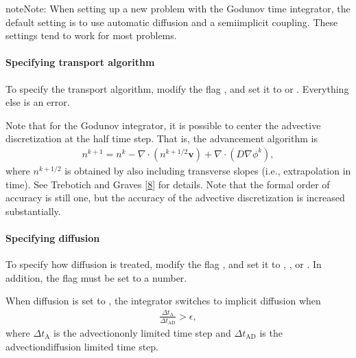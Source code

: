 \documentclass[letterpaper,10pt,english]{sphinxmanual}
\begin{document}
\begin{sphinxadmonition}{note}{Note:}
\sphinxAtStartPar
When setting up a new problem with the Godunov time integrator, the default setting is to use automatic diffusion and a semi\sphinxhyphen{}implicit coupling.
These settings tend to work for most problems.
\end{sphinxadmonition}


\paragraph{Specifying transport algorithm}
\label{\detokenize{Applications/CdrPlasmaModel:specifying-transport-algorithm}}
\sphinxAtStartPar
To specify the transport algorithm, modify the flag , and set it to  or .
Everything else is an error.

\sphinxAtStartPar
Note that for the Godunov integrator, it is possible to center the advective discretization at the half time step.
That is, the advancement algorithm is
\begin{equation*}
\begin{split}n^{k+1} = n^{k} - \nabla\cdot\left(n^{k+1/2}\mathbf{v}\right) + \nabla\cdot\left(D\nabla\phi^k\right),\end{split}
\end{equation*}
\sphinxAtStartPar
where \(n^{k+1/2}\) is obtained by also including transverse slopes (i.e., extrapolation in time).
See Trebotich and Graves {[}\hyperlink{cite.ZZReferences:id157}{8}{]} for details.
Note that the formal order of accuracy is still one, but the accuracy of the advective discretization is increased substantially.


\paragraph{Specifying diffusion}
\label{\detokenize{Applications/CdrPlasmaModel:specifying-diffusion}}
\sphinxAtStartPar
To specify how diffusion is treated, modify the flag , and set it to , , or .
In addition, the flag  must be set to a number.

\sphinxAtStartPar
When diffusion is set to , the integrator switches to implicit diffusion when
\begin{equation*}
\begin{split}\frac{\Delta t_{\textrm{A}}}{\Delta t_{\textrm{AD}}} > \epsilon,\end{split}
\end{equation*}
\sphinxAtStartPar
where \(\Delta t_{\textrm{A}}\) is the advection\sphinxhyphen{}only limited time step and \(\Delta t_{\textrm{AD}}\) is the advection\sphinxhyphen{}diffusion limited time step.
\end{document}
